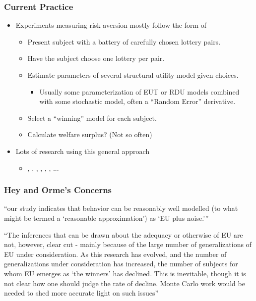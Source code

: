 \documentclass{beamer}
\begin{document}
\begin{frame}
\frametitle{Current Practice}
\begin{itemize}
	\item Experiments measuring risk aversion mostly follow the form of \textcite{Hey1994}
		\begin{itemize}
			\item Present subject with a battery of carefully chosen lottery pairs.
			\item Have the subject choose one lottery per pair.
			\item Estimate parameters of several structural utility model given choices.
				\begin{itemize}
					\item Usually some parameterization of EUT or RDU models combined with some stochastic model, often a \enquote{Random Error} derivative.
				\end{itemize}
			\item Select a \enquote{winning} model for each subject.
			\item Calculate welfare surplus? (Not so often)
		\end{itemize}
	\item Lots of research using this general approach
		\begin{itemize}
			\item \textcite{Hey1994, Hey1995, Hey2001}, \textcite{Loomes1995, Loomes1998}, \textcite{Conte2011}, \textcite{Harrison2005}, \textcite{Harrison2005a}, \textcite{Harrison2008}, \textcite{Harrison2016} ...
		\end{itemize}
\end{itemize}
\end{frame}

\begin{frame}
\frametitle{Hey and Orme's Concerns}

\enquote{\textelp{}our study indicates that behavior can be reasonably well modelled (to what might be termed a \enquote{reasonable approximation}) as \enquote{EU plus noise.}}

\hfill \break

\enquote{The inferences that can be drawn \textelp{} about the adequacy or otherwise of EU are not, however, clear cut - mainly because of the large number of generalizations of EU under consideration.
As this research has evolved, and the number of generalizations under consideration has increased, the number of subjects for whom EU emerges as \enquote{the winners} has declined. 
This is inevitable, though it is not clear how one should judge the rate of decline.
\textelp{} Monte Carlo work would be needed to shed more accurate light on such issues}
\end{frame}
\end{document}

